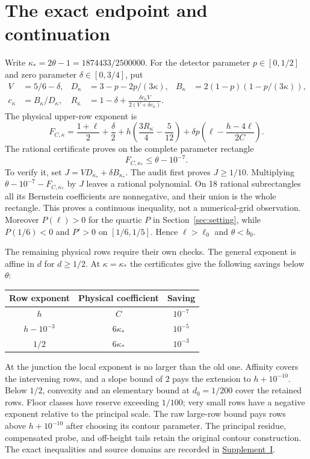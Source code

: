 \documentclass[11pt]{article}
\newcommand{\supp}[1]{\href{supplement.pdf}{Supplement~#1}}
\begin{document}
\section{The exact endpoint and continuation}\label{sec:continuation}

Write $\kappa_*=2\theta-1=1874433/2500000$. For the detector parameter
$p\in[0,1/2]$ and zero parameter $\delta\in[0,3/4]$, put
\begin{align*}
 V&=5/6-\delta,&
 D_\kappa&=3-p-2p/(3\kappa),&
 B_\kappa&=2(1-p)(1-p/(3\kappa)),\\
 c_\kappa&=B_\kappa/D_\kappa,&
 R_\kappa&=1-\delta+
 \frac{\delta c_\kappa V}{2(V+\delta c_\kappa)}.
\end{align*}
The physical upper-row exponent is
\begin{equation}\label{eq:F}
 F_{C,\kappa}=\frac{1+\ell}{2}+\frac\delta2
 +h\left(\frac{3R_\kappa}4-\frac5{12}\right)
 +\delta p\left(\ell-\frac{h-4\ell}{2C}\right).
\end{equation}
The rational certificate proves on the complete parameter rectangle
\begin{equation}\label{eq:certificate}
 F_{C,\kappa_*}\le\theta-10^{-7}.
\end{equation}
To verify it, set $J=VD_{\kappa_*}+\delta B_{\kappa_*}$.
The audit first proves $J\ge1/10$. Multiplying
$\theta-10^{-7}-F_{C,\kappa_*}$ by $J$ leaves a rational polynomial.
On 18 rational subrectangles all its Bernstein coefficients are
nonnegative, and their union is the whole rectangle. This proves a
continuous inequality, not a numerical-grid observation.
Moreover $P(\ell)>0$ for the quartic $P$ in Section~\ref{sec:setting},
while $P(1/6)<0$ and $P'>0$ on $[1/6,1/5]$. Hence $\ell>\ell_0$
and $\theta<b_0$.

The remaining physical rows require their own checks. The general
exponent is affine in $d$ for $d\ge1/2$. At $\kappa=\kappa_*$ the
certificates give the following savings below $\theta$:
\begin{center}
\begin{tabular}{ccc}
\toprule
Row exponent & Physical coefficient & Saving\\
\midrule
$h$ & $C$ & $10^{-7}$\\
$h-10^{-3}$ & $6\kappa_*$ & $10^{-5}$\\
$1/2$ & $6\kappa_*$ & $10^{-3}$\\
\bottomrule
\end{tabular}
\end{center}
At the junction the local exponent is no larger than the old one.
Affinity covers the intervening rows, and a slope bound of $2$ pays
the extension to $h+10^{-10}$. Below $1/2$, convexity and an elementary
bound at $d_0=1/200$ cover the retained rows. Floor classes have reserve
exceeding $1/100$; very small rows have a negative exponent relative to the principal scale.
The raw large-row bound pays rows above $h+10^{-10}$ after choosing
its contour parameter. The principal residue, compensated probe,
and off-height tails retain the original contour construction.
The exact inequalities and source domains are recorded in \supp{I}.
\end{document}
